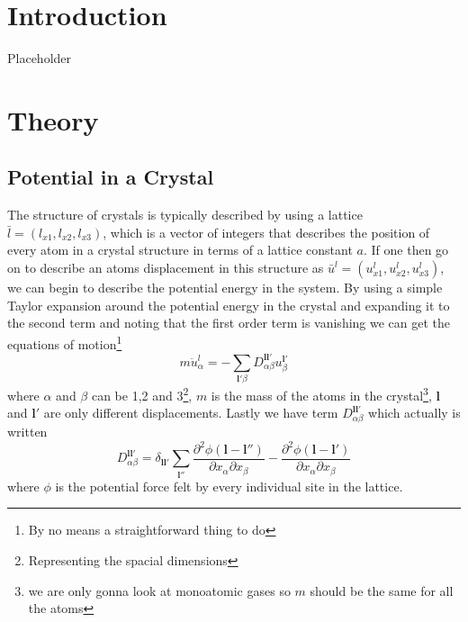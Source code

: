 \documentclass[11pt]{article}
\begin{document}
\section{Introduction}
Placeholder
\section{Theory}
\subsection{Potential in a Crystal}
The structure of crystals is typically described by using a lattice $\bar{l} = (l_{x1}, l_{x2}, l_{x3})$, which is a vector of integers that describes the position of every atom in a crystal structure in terms of a lattice constant $a$. If one then go on to describe an atoms displacement in this structure as $\bar{u}^l = (u^l_{x1},u^l_{x2},u^l_{x3})$, we can begin to describe the potential energy in the system. By using a simple Taylor expansion around the potential energy in the crystal and expanding it to the second term and noting that the first order term is vanishing we can get the equations of motion\footnote{By no means a straightforward thing to do} 
\begin{equation}
	m \ddot{u}^l_{\alpha} = - \sum_{\mathbf{l}'\beta} D^{\mathbf{l}\mathbf{l}'}_{\alpha \beta} u^{\mathbf{l}'}_{\beta}
	\label{eq:motion}
\end{equation}
where $\alpha$ and $\beta$ can be 1,2 and 3\footnote{Representing the spacial dimensions}, $m$ is the mass of the atoms in the crystal\footnote{we are only gonna look at monoatomic gases so $m$ should be the same for all the atoms}, $\mathbf{l}$ and $\mathbf{l}'$ are only different displacements. Lastly we have term $D^{\mathbf{l}\mathbf{l}'}_{\alpha \beta}$ which actually is written
\begin{equation}
	D^{\mathbf{l}\mathbf{l}'}_{\alpha \beta} = \delta_{\mathbf{l} \mathbf{l}'} \sum_{\mathbf{l}''} \frac{\partial^2 \phi (\mathbf{l}-\mathbf{l}'')}{\partial x_{\alpha} \partial x_{\beta}}
	-
	\frac{\partial^2 \phi (\mathbf{l}-\mathbf{l}')}{\partial x_{\alpha} \partial x_{\beta}}
\end{equation}
where $\phi$ is the potential force felt by every individual site in the lattice. 
\end{document}
